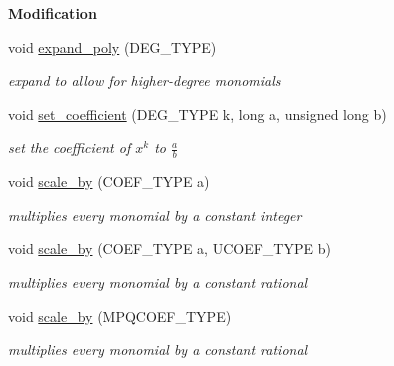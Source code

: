 \begin{Indent}\textbf{ Modification}\par
\begin{DoxyCompactItemize}
\item 
void \hyperlink{group__polygroup_a57f7bbe1cd7ae1c2ca66d12f988a9c6d}{expand\+\_\+poly} (D\+E\+G\+\_\+\+T\+Y\+PE)
\begin{DoxyCompactList}\small\item\em expand to allow for higher-\/degree monomials \end{DoxyCompactList}\item 
\mbox{\label{group__polygroup_a2b1793fec574a10d0c4d1f5979c81a48}} 
void \hyperlink{group__polygroup_a2b1793fec574a10d0c4d1f5979c81a48}{set\+\_\+coefficient} (D\+E\+G\+\_\+\+T\+Y\+PE k, long a, unsigned long b)
\begin{DoxyCompactList}\small\item\em set the coefficient of $x^k$ to $\frac{a}{b}$ \end{DoxyCompactList}\item 
\mbox{\label{group__polygroup_accb38470c561da8878937486c9c3c4e7}} 
void \hyperlink{group__polygroup_accb38470c561da8878937486c9c3c4e7}{scale\+\_\+by} (C\+O\+E\+F\+\_\+\+T\+Y\+PE a)
\begin{DoxyCompactList}\small\item\em multiplies every monomial by a constant integer \end{DoxyCompactList}\item 
void \hyperlink{group__polygroup_a75113519785d8fba7d957b630bd26a54}{scale\+\_\+by} (C\+O\+E\+F\+\_\+\+T\+Y\+PE a, U\+C\+O\+E\+F\+\_\+\+T\+Y\+PE b)
\begin{DoxyCompactList}\small\item\em multiplies every monomial by a constant rational \end{DoxyCompactList}\item 
\mbox{\label{group__polygroup_a27a55586b3cd4880a45a5747d362db14}} 
void \hyperlink{group__polygroup_a27a55586b3cd4880a45a5747d362db14}{scale\+\_\+by} (M\+P\+Q\+C\+O\+E\+F\+\_\+\+T\+Y\+PE)
\begin{DoxyCompactList}\small\item\em multiplies every monomial by a constant rational \end{DoxyCompactList}\item 

\end{DoxyCompactItemize}
\end{Indent}
